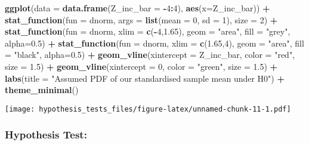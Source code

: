 \documentclass[]{article}
\newenvironment{Shaded}{\begin{snugshade}}{\end{snugshade}}
\newcommand{\KeywordTok}[1]{\textcolor[rgb]{0.13,0.29,0.53}{\textbf{#1}}}
\newcommand{\DataTypeTok}[1]{\textcolor[rgb]{0.13,0.29,0.53}{#1}}
\newcommand{\DecValTok}[1]{\textcolor[rgb]{0.00,0.00,0.81}{#1}}
\newcommand{\FloatTok}[1]{\textcolor[rgb]{0.00,0.00,0.81}{#1}}
\newcommand{\StringTok}[1]{\textcolor[rgb]{0.31,0.60,0.02}{#1}}
\newcommand{\OperatorTok}[1]{\textcolor[rgb]{0.81,0.36,0.00}{\textbf{#1}}}
\newcommand{\NormalTok}[1]{#1}
\begin{document}
\begin{Shaded}
\begin{Highlighting}[]
\KeywordTok{ggplot}\NormalTok{(}\DataTypeTok{data =}  \KeywordTok{data.frame}\NormalTok{(}\DataTypeTok{Z_inc_bar =} \OperatorTok{-}\DecValTok{4}\OperatorTok{:}\DecValTok{4}\NormalTok{), }\KeywordTok{aes}\NormalTok{(}\DataTypeTok{x=}\NormalTok{Z_inc_bar)) }\OperatorTok{+}
\StringTok{  }\KeywordTok{stat_function}\NormalTok{(}\DataTypeTok{fun =}\NormalTok{ dnorm, }\DataTypeTok{args =} \KeywordTok{list}\NormalTok{(}\DataTypeTok{mean =} \DecValTok{0}\NormalTok{, }\DataTypeTok{sd =} \DecValTok{1}\NormalTok{), }\DataTypeTok{size =} \DecValTok{2}\NormalTok{) }\OperatorTok{+}
\StringTok{    }\KeywordTok{stat_function}\NormalTok{(}\DataTypeTok{fun =}\NormalTok{ dnorm, }\DataTypeTok{xlim =} \KeywordTok{c}\NormalTok{(}\OperatorTok{-}\DecValTok{4}\NormalTok{,}\FloatTok{1.65}\NormalTok{), }\DataTypeTok{geom =} \StringTok{"area"}\NormalTok{, }\DataTypeTok{fill =} \StringTok{"grey"}\NormalTok{, }\DataTypeTok{alpha=}\FloatTok{0.5}\NormalTok{) }\OperatorTok{+}
\StringTok{  }\KeywordTok{stat_function}\NormalTok{(}\DataTypeTok{fun =}\NormalTok{ dnorm, }\DataTypeTok{xlim =} \KeywordTok{c}\NormalTok{(}\FloatTok{1.65}\NormalTok{,}\DecValTok{4}\NormalTok{), }\DataTypeTok{geom =} \StringTok{"area"}\NormalTok{, }\DataTypeTok{fill =} \StringTok{"black"}\NormalTok{, }\DataTypeTok{alpha=}\FloatTok{0.5}\NormalTok{) }\OperatorTok{+}
\StringTok{  }\KeywordTok{geom_vline}\NormalTok{(}\DataTypeTok{xintercept =}\NormalTok{ Z_inc_bar, }\DataTypeTok{color =} \StringTok{"red"}\NormalTok{, }\DataTypeTok{size =} \FloatTok{1.5}\NormalTok{) }\OperatorTok{+}
\StringTok{  }\KeywordTok{geom_vline}\NormalTok{(}\DataTypeTok{xintercept =} \DecValTok{0}\NormalTok{, }\DataTypeTok{color =} \StringTok{"green"}\NormalTok{, }\DataTypeTok{size =} \FloatTok{1.5}\NormalTok{) }\OperatorTok{+}
\StringTok{  }\KeywordTok{labs}\NormalTok{(}\DataTypeTok{title =} \StringTok{"Assumed PDF of our standardised sample mean under H0"}\NormalTok{) }\OperatorTok{+}
\StringTok{  }\KeywordTok{theme_minimal}\NormalTok{()}
\end{Highlighting}
\end{Shaded}

\texttt{[image: hypothesis\_tests\_files/figure-latex/unnamed-chunk-11-1.pdf]}

\subsubsection{Hypothesis Test:}\label{hypothesis-test}
\end{document}
